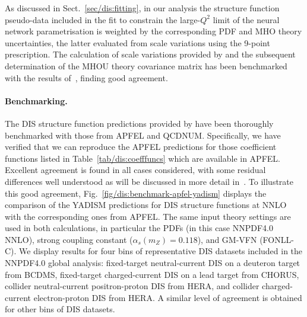 As discussed in Sect.~\ref{sec/dis:fitting}, in our analysis the \yadism
structure function pseudo-data included in the fit to constrain the
large-$Q^2$ limit of the neural network parametrisation is weighted
by the corresponding PDF and MHO theory uncertainties, the latter
evaluated from scale variations using the 9-point prescription.
%
The calculation of scale variations provided by \yadism and the subsequent
determination of the MHOU theory covariance matrix has been benchmarked
with the results of~\cite{NNPDF:2019ubu}, finding good agreement.

\paragraph{Benchmarking.}
%
The DIS structure function predictions provided by \yadism
have been thoroughly benchmarked  with those from {\sc\small
  APFEL} and {\sc\small QCDNUM}.
%
Specifically, we have verified that we can reproduce
the {\sc\small APFEL} predictions for those coefficient functions listed
in Table~\ref{tab/dis:coefffuncs} which are available in {\sc\small APFEL}.
%
Excellent agreement is found in all cases considered, with some residual
differences well understood as will be discussed in more detail in~\cite{yadism}.
%
To illustrate this good agreement,
Fig.~\ref{fig/dis:benchmark-apfel-yadism} displays
the comparison of the {\sc\small YADISM} predictions for DIS structure functions at NNLO
with the corresponding ones from {\sc\small APFEL}.
%
The same input theory settings are used in both calculations,
in particular the PDFs (in this case NNPDF4.0 NNLO), strong coupling constant ($\alpha_s(m_Z)=0.118$),
and GM-VFN (FONLL-C).
%
We display results for four bins of representative DIS datasets included
in the NNPDF4.0 global analysis: fixed-target neutral-current DIS on a deuteron target
from BCDMS, fixed-target charged-current DIS on a lead target
from CHORUS, collider neutral-current positron-proton DIS from HERA,
and collider charged-current electron-proton DIS from HERA.
%
A similar level of agreement is obtained for other bins
of DIS datasets.

